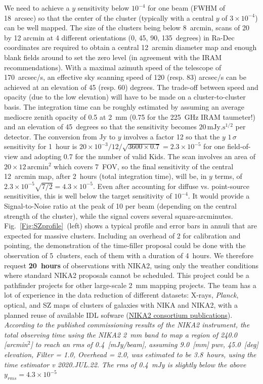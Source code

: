 \documentclass[10pt,a4paper,twoside,graphicx,color]{article}
\begin{document}
We need to achieve a $y$ sensitivity below $10^{-4}$ for one beam
(FWHM of 18~arcsec) so that the center of the cluster (typically with
a central $y$ of $3\times 10^{-4}$) can be well mapped. The size of
the clusters being below 8~arcmin, scans of 20 by 12 arcmin at 4
different orientations (0, 45, 90, 135~degrees) in Ra-Dec coordinates
are required to obtain a central 12~arcmin diameter map and enough
blank fields around to set the zero level (in agreement with the IRAM
recommendations). With a maximal azimuth speed of the telescope of
170~arcsec/s, an effective sky scanning speed of 120 (resp. 83)
arcsec/s can be achieved at an elevation of 45 (resp. 60) degrees. The
trade-off between speed and opacity (due to the low elevation) will
have to be made on a cluster-to-cluster basis. The integration time
can be roughly estimated by assuming an average mediocre zenith
opacity of 0.5 at 2~mm (0.75 for the 225~GHz IRAM taumeter!) and an
elevation of 45~degrees so that the sensitivity becomes
$20\,\mathrm{mJy.s^{1/2}}$ per detector. The conversion from Jy to $y$
involves a factor 12 so that the $y$ $1\,\sigma$ sensitivity for
1~hour is $20\times 10^{-3}/12/\sqrt{3600\times 0.7}=2.3\times
10^{-5}$ for one field-of-view and adopting 0.7 for the number of
valid Kids. The scan involves an area of $20\times
12\,\mathrm{arcmin^2}$ which covers 7~FOV, so the final sensitivity of
the central 12~arcmin map, after 2~hours (total integration time),
will be, in $y$ terms, of $2.3\times 10^{-5}\sqrt{7/2}=4.3\times
10^{-5}$. Even after accounting for diffuse vs. point-source
sensitivities, this is well below the target sensitivity of
$10^{-4}$. It would provide a Signal-to-Noise ratio at the peak of 10
per beam (depending on the central strength of the cluster), while the
signal covers several
square-arcminutes. Fig.~\ref{Fig:SZprofile}~(left) shows a typical
profile and error bars in annuli that are expected for massive
clusters. Including an overhead of 2 for calibration and pointing, the
demonstration of the time-filler proposal could be done with the
observation of 5~clusters, each of them with a duration of 4~hours. We
therefore request {\bf 20~hours} of observations with NIKA2, using
only the weather conditions where standard NIKA2 proposals cannot be
scheduled. This project could be a pathfinder projects for other
large-scale 2~mm mapping projects. The team has a lot of experience in
the data reduction of different datasets: X-rays, {\sl Planck},
optical, and SZ maps of clusters of galaxies with NIKA and NIKA2, with
a planned reuse of available IDL sofware
(\href{https://ipag.osug.fr/nika2/Publications.html}{NIKA2 consortium
  publications}).  {\sl According to the published commissioning
  results of the NIKA2 instrument, the total observing time using the
  NIKA2 2~mm band to map a region of 240.0 [arcmin$^2$] to reach an
  rms of 0.4~[mJy/beam], assuming 9.0~[mm] pwv, 45.0~[deg] elevation,
  Filter = 1.0, Overhead = 2.0, was estimated to be 3.8~hours, using
  the time estimator v 2020.JUL.22. The rms of 0.4~mJy is slightly
  below the above $y_{rms}=4.3\times 10^{-5}$}
\end{document}
